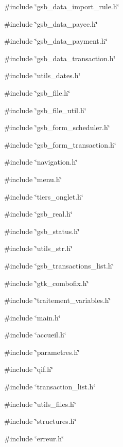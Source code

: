 {\ttfamily \#include \char`\"{}gsb\_\-data\_\-import\_\-rule.h\char`\"{}}\par
{\ttfamily \#include \char`\"{}gsb\_\-data\_\-payee.h\char`\"{}}\par
{\ttfamily \#include \char`\"{}gsb\_\-data\_\-payment.h\char`\"{}}\par
{\ttfamily \#include \char`\"{}gsb\_\-data\_\-transaction.h\char`\"{}}\par
{\ttfamily \#include \char`\"{}utils\_\-dates.h\char`\"{}}\par
{\ttfamily \#include \char`\"{}gsb\_\-file.h\char`\"{}}\par
{\ttfamily \#include \char`\"{}gsb\_\-file\_\-util.h\char`\"{}}\par
{\ttfamily \#include \char`\"{}gsb\_\-form\_\-scheduler.h\char`\"{}}\par
{\ttfamily \#include \char`\"{}gsb\_\-form\_\-transaction.h\char`\"{}}\par
{\ttfamily \#include \char`\"{}navigation.h\char`\"{}}\par
{\ttfamily \#include \char`\"{}menu.h\char`\"{}}\par
{\ttfamily \#include \char`\"{}tiers\_\-onglet.h\char`\"{}}\par
{\ttfamily \#include \char`\"{}gsb\_\-real.h\char`\"{}}\par
{\ttfamily \#include \char`\"{}gsb\_\-status.h\char`\"{}}\par
{\ttfamily \#include \char`\"{}utils\_\-str.h\char`\"{}}\par
{\ttfamily \#include \char`\"{}gsb\_\-transactions\_\-list.h\char`\"{}}\par
{\ttfamily \#include \char`\"{}gtk\_\-combofix.h\char`\"{}}\par
{\ttfamily \#include \char`\"{}traitement\_\-variables.h\char`\"{}}\par
{\ttfamily \#include \char`\"{}main.h\char`\"{}}\par
{\ttfamily \#include \char`\"{}accueil.h\char`\"{}}\par
{\ttfamily \#include \char`\"{}parametres.h\char`\"{}}\par
{\ttfamily \#include \char`\"{}qif.h\char`\"{}}\par
{\ttfamily \#include \char`\"{}transaction\_\-list.h\char`\"{}}\par
{\ttfamily \#include \char`\"{}utils\_\-files.h\char`\"{}}\par
{\ttfamily \#include \char`\"{}structures.h\char`\"{}}\par
{\ttfamily \#include \char`\"{}erreur.h\char`\"{}}\par
